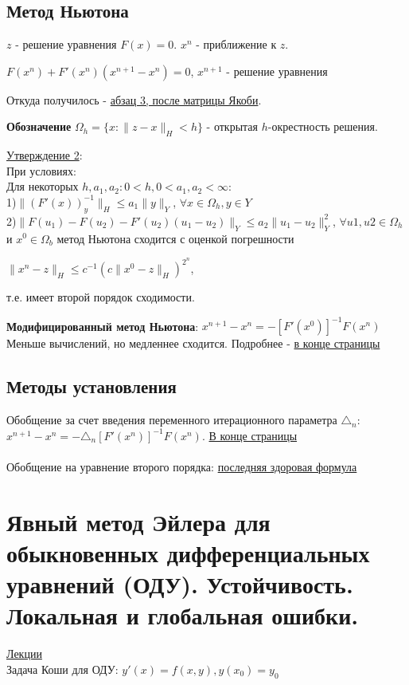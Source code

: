 \documentclass[specialist, subf, href, colorlinks=true, 12pt, times, mtpro, final]{disser}
\theoremstyle{definition}
\begin{document}
{\subsection {Метод Ньютона}
$z$ - решение уравнения $F(x) = 0$. $x^n$ - приближение к $z$.
\begin{center}
$F(x^n) + F'(x^n)(x^{n+1} - x^n) = 0$, $x^{n+1}$ - решение уравнения
\end{center}
Откуда получилось - \hyperlink {lects.83}{абзац 3, после матрицы Якоби}.

\textbf{Обозначение} $\Omega_h = \{x: \|z-x\|_H < h\}$ - открытая $h$-окрестность решения.

\hyperlink {lects.84}{Утверждение 2}:\\
При условиях:\\
Для некоторых $h,a_1,a_2: 0 <h, 0<a_1,a_2<\infty$:\\
1)$\|(F'(x))^{-1}_y\|_H \leq a_1\|y\|_Y$, $\forall x \in \Omega_h, y \in Y$\\
2)$\|F(u_1)-F(u_2) - F'(u_2)(u_1-u_2)\|_Y \leq a_2\|u_1-u_2\|^2_Y$, $\forall u1,u2 \in \Omega_h$
\\ и $x^0 \in \Omega_b$ метод Ньютона сходится с оценкой погрешности 
\begin{center}
$\|x^n-z\|_H \leq c^{-1} (c\| x^0 - z\|_H)^{2^n}$, 
\end{center} т.е. имеет второй порядок сходимости.

\textbf{Модифицированный метод Ньютона}: 
$x^{n+1} - x^n = -[F'(x^0)]^{-1}F(x^n)$ \\
Меньше вычислений, но медленнее сходится. Подробнее - \hyperlink {lects.84}{в конце страницы}

\subsection {Методы установления}

Обобщение за счет введения переменного итерационного параметра $\triangle_n$: $x^{n+1} - x^n= -\triangle_n [F'(x^n)]^{-1}F(x^n)$. \hyperlink {lects.85}{В конце страницы}
\\
\\
Обобщение на уравнение второго порядка: \hyperlink {lects.86}{последняя здоровая формула}

    

\section {Явный метод Эйлера для обыкновенных дифференциальных уравнений (ОДУ). Устойчивость. Локальная и глобальная ошибки.}
    \hyperlink {lects.87}{Лекции}\\
    Задача Коши для ОДУ: 
    $y'(x)=f(x,y), y(x_0) = y_0$\\
    
}
\end{document}
